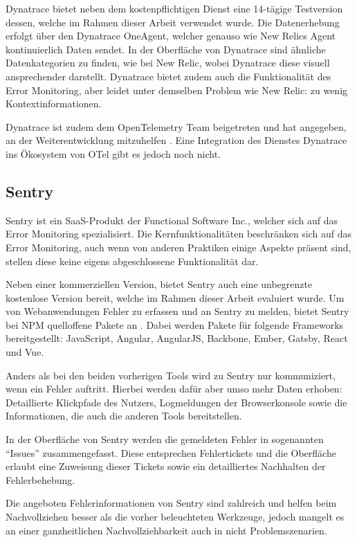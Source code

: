Dynatrace bietet neben dem kostenpflichtigen Dienst eine 14-tägige Testversion dessen, welche im Rahmen dieser Arbeit verwendet wurde. Die Datenerhebung erfolgt über den Dynatrace OneAgent, welcher genauso wie New Relics Agent kontinuierlich Daten sendet. In der Oberfläche von Dynatrace sind ähnliche Datenkategorien zu finden, wie bei New Relic, wobei Dynatrace diese visuell ansprechender darstellt. Dynatrace bietet zudem auch die Funktionalität des Error Monitoring, aber leidet unter demselben Problem wie New Relic: zu wenig Kontextinformationen.

Dynatrace ist zudem dem OpenTelemetry Team beigetreten und hat angegeben, an der Weiterentwicklung mitzuhelfen \cite{DynatraceJoinOTelProject}. Eine Integration des Dienstes Dynatrace ins Ökosystem von OTel gibt es jedoch noch nicht.

\subsection{Sentry}

Sentry \cite{Sentry} ist ein SaaS-Produkt der Functional Software Inc., welcher sich auf das Error Monitoring spezialisiert. Die Kernfunktionalitäten beschränken sich auf das Error Monitoring, auch wenn von anderen Praktiken einige Aspekte präsent sind, stellen diese keine eigens abgeschlossene Funktionalität dar.

Neben einer kommerziellen Version, bietet Sentry auch eine unbegrenzte kostenlose Version bereit, welche im Rahmen dieser Arbeit evaluiert wurde. Um von Webanwendungen Fehler zu erfassen und an Sentry zu melden, bietet Sentry bei NPM quelloffene Pakete an \cite{SentryJSGithub}. Dabei werden Pakete für folgende Frameworks bereitgestellt: JavaScript, Angular, AngularJS, Backbone, Ember, Gatsby, React und Vue.

Anders als bei den beiden vorherigen Tools wird zu Sentry nur kommuniziert, wenn ein Fehler auftritt. Hierbei werden dafür aber umso mehr Daten erhoben: Detaillierte Klickpfade des Nutzers, Logmeldungen der Browserkonsole sowie die Informationen, die auch die anderen Tools bereitstellen.

In der Oberfläche von Sentry werden die gemeldeten Fehler in sogenannten \enquote{Issues} zusammengefasst. Diese entsprechen Fehlertickets und die Oberfläche erlaubt eine Zuweisung dieser Tickets sowie ein detailliertes Nachhalten der Fehlerbehebung.

Die angeboten Fehlerinformationen von Sentry sind zahlreich und helfen beim Nachvollziehen besser als die vorher beleuchteten Werkzeuge, jedoch mangelt es an einer ganzheitlichen Nachvollziehbarkeit auch in nicht Problemszenarien.

